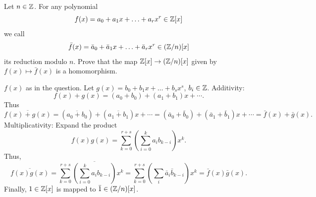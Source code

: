 \documentclass[10pt, a4paper]{article}
\begin{document}
\begin{problem}[Question $11$]
    Let $n \in \mathbb{Z}$.
    For any polynomial
    \[
    f(x) = a_0 + a_1x + \dotsc + a_rx ^ r \in \mathbb{Z}[x]
    \]
    we call
    \[
    \bar{f}(x) = \bar{a}_0 + \bar{a}_1x + \dotsc + \bar{a}_rx ^ r \in (\mathbb{Z} / n)[x]
    \]
    its reduction modulo $n$.
    Prove that the map $\mathbb{Z}[x] \to (\mathbb{Z} / n)[x]$ given by $f(x) \mapsto \bar{f}(x)$ is a homomorphism.


    \begin{solution}
        $f(x)$ as in the question.
        Let $g(x) = b_0 + b_1x + \dotsc + b_sx ^ s$,
        $b_i \in \mathbb{Z}$.
        Additivity:
        \[
        f(x) + g(x) = (a_0 + b_0) + (a_1 + b_1)x + \dotsi.
        \]
        Thus
        \[
        \overline{f(x) + g(x)} = (\overline{a_0 + b_0}) + (\overline{a_1 + b_1})x + \dotsi = (\bar{a}_0 + \bar{b}_0) + (\bar{a}_1 + \bar{b}_1)x + \dotsi = \bar{f}(x) + \bar{g}(x).
        \]
        Multiplicativity:
        Expand the product
        \[
        f(x)g(x) = \sum_{k = 0}^{r + s}\left(\sum_{i = 0}^{k}a_ib_{k - i}\right)x ^ k.
        \]
        Thus,
        \[
        \overline{f(x)g(x)} = \sum_{k = 0}^{r + s}\overline{\left(\sum_{i = 0}^{k}a_ib_{k - i}\right)}x ^ k = \sum_{k = 0}^{r + s}\left(\sum_{i}\bar{a}_i\bar{b}_{k - i}\right)x ^ k = \bar{f}(x)\bar{g}(x).
        \]
        Finally,
        $1 \in \mathbb{Z}[x]$ is mapped to $\bar{1} \in (\mathbb{Z} / n)[x]$.
    \end{solution}
\end{problem}
\end{document}

